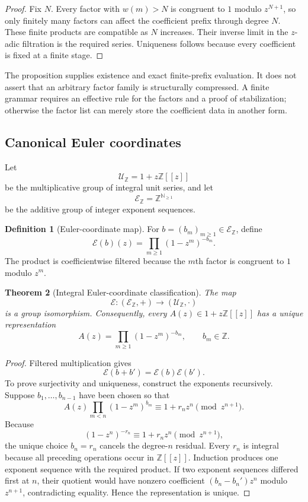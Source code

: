 \documentclass[11pt]{article}
\newtheorem{theorem}{Theorem}[section]
\theoremstyle{definition}
\newtheorem{definition}[theorem]{Definition}
\theoremstyle{remark}
\begin{document}
\begin{proof}
Fix $N$.  Every factor with $w(m)>N$ is congruent to $1$ modulo $z^{N+1}$, so only finitely many factors can affect the coefficient prefix through degree $N$.  These finite products are compatible as $N$ increases.  Their inverse limit in the $z$-adic filtration is the required series.  Uniqueness follows because every coefficient is fixed at a finite stage.
\end{proof}

The proposition supplies existence and exact finite-prefix evaluation.  It does not assert that an arbitrary factor family is structurally compressed.  A finite grammar requires an effective rule for the factors and a proof of stabilization; otherwise the factor list can merely store the coefficient data in another form.

\subsection{Canonical Euler coordinates}

Let
\[
\mathcal U_{\mathbb Z}=1+z\mathbb Z[[z]]
\]
be the multiplicative group of integral unit series, and let
\[
\mathcal E_{\mathbb Z}=\mathbb Z^{\mathbb N_{\geq1}}
\]
be the additive group of integer exponent sequences.

\begin{definition}[Euler-coordinate map]
For $b=(b_m)_{m\geq1}\in\mathcal E_{\mathbb Z}$, define
\[
\mathcal E(b)(z)
=
\prod_{m\geq1}(1-z^m)^{-b_m}.
\]
The product is coefficientwise filtered because the $m$th factor is congruent to $1$ modulo $z^m$.
\end{definition}

\begin{theorem}[Integral Euler-coordinate classification]
\label{thm:block07-euler-classification}
The map
\[
\mathcal E:
(\mathcal E_{\mathbb Z},+)
\longrightarrow
(\mathcal U_{\mathbb Z},\cdot)
\]
is a group isomorphism.  Consequently, every $A(z)\in1+z\mathbb Z[[z]]$ has a unique representation
\[
\boxed{
A(z)=\prod_{m\geq1}(1-z^m)^{-b_m},
\qquad b_m\in\mathbb Z.
}
\]
\end{theorem}

\begin{proof}
Filtered multiplication gives
\[
\mathcal E(b+b')=\mathcal E(b)\mathcal E(b').
\]
To prove surjectivity and uniqueness, construct the exponents recursively.  Suppose $b_1,\ldots,b_{n-1}$ have been chosen so that
\[
A(z)\prod_{m<n}(1-z^m)^{b_m}
\equiv 1+r_nz^n\pmod{z^{n+1}}.
\]
Because
\[
(1-z^n)^{-r_n}\equiv1+r_nz^n\pmod{z^{n+1}},
\]
the unique choice $b_n=r_n$ cancels the degree-$n$ residual.  Every $r_n$ is integral because all preceding operations occur in $\mathbb Z[[z]]$.  Induction produces one exponent sequence with the required product.  If two exponent sequences differed first at $n$, their quotient would have nonzero coefficient $(b_n-b_n')z^n$ modulo $z^{n+1}$, contradicting equality.  Hence the representation is unique.
\end{proof}
\end{document}
